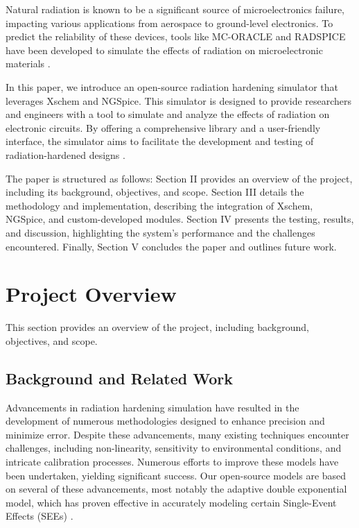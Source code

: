 \documentclass[conference]{IEEEtran}
\begin{document}
Natural radiation is known to be a significant source of microelectronics failure, impacting various applications from aerospace to ground-level electronics. To predict the reliability of these devices, tools like MC-ORACLE and RADSPICE have been developed to simulate the effects of radiation on microelectronic materials \cite{Wrobel2011, Florian1986}.

In this paper, we introduce an open-source radiation hardening simulator that leverages Xschem and NGSpice. This simulator is designed to provide researchers and engineers with a tool to simulate and analyze the effects of radiation on electronic circuits. By offering a comprehensive library and a user-friendly interface, the simulator aims to facilitate the development and testing of radiation-hardened designs \cite{Pepper1990}.

The paper is structured as follows: Section II provides an overview of the project, including its background, objectives, and scope. Section III details the methodology and implementation, describing the integration of Xschem, NGSpice, and custom-developed modules. Section IV presents the testing, results, and discussion, highlighting the system's performance and the challenges encountered. Finally, Section V concludes the paper and outlines future work.

\section{Project Overview}
This section provides an overview of the project, including background, objectives, and scope.

\subsection{Background and Related Work}
Advancements in radiation hardening simulation have resulted in the development of numerous methodologies designed to enhance precision and minimize error. Despite these advancements, many existing techniques encounter challenges, including non-linearity, sensitivity to environmental conditions, and intricate calibration processes. Numerous efforts to improve these models have been undertaken, yielding significant success. Our open-source models are based on several of these advancements, most notably the adaptive double exponential model, which has proven effective in accurately modeling certain Single-Event Effects (SEEs) \cite{}.
\end{document}
